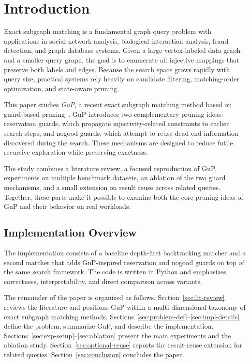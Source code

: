 \section{Introduction}

Exact subgraph matching is a fundamental graph query problem with applications in social-network analysis, biological interaction analysis, fraud detection, and graph database systems. Given a large vertex-labeled data graph and a smaller query graph, the goal is to enumerate all injective mappings that preserve both labels and edges. Because the search space grows rapidly with query size, practical systems rely heavily on candidate filtering, matching-order optimization, and state-aware pruning.

This paper studies \emph{GuP}, a recent exact subgraph matching method based on guard-based pruning~\cite{arai2023gup}. GuP introduces two complementary pruning ideas: reservation guards, which propagate injectivity-related constraints to earlier search steps, and nogood guards, which attempt to reuse dead-end information discovered during the search. These mechanisms are designed to reduce futile recursive exploration while preserving exactness.

The study combines a literature review, a focused reproduction of GuP, experiments on multiple benchmark datasets, an ablation of the two guard mechanisms, and a small extension on result reuse across related queries. Together, these parts make it possible to examine both the core pruning ideas of GuP and their behavior on real workloads.

\subsection{Implementation Overview}

The implementation consists of a baseline depth-first backtracking matcher and a second matcher that adds GuP-inspired reservation and nogood guards on top of the same search framework. The code is written in Python and emphasizes correctness, interpretability, and direct comparison across variants.

The remainder of the paper is organized as follows. Section~\ref{sec:lit-review} reviews the literature and positions GuP within a multi-dimensional taxonomy of exact subgraph matching methods. Sections~\ref{sec:problem-def}--\ref{sec:impl-details} define the problem, summarize GuP, and describe the implementation. Sections~\ref{sec:exp-setup}--\ref{sec:ablation} present the main experiments and the ablation study. Section~\ref{sec:optional-reuse} reports the result-reuse extension for related queries. Section~\ref{sec:conclusion} concludes the paper.
